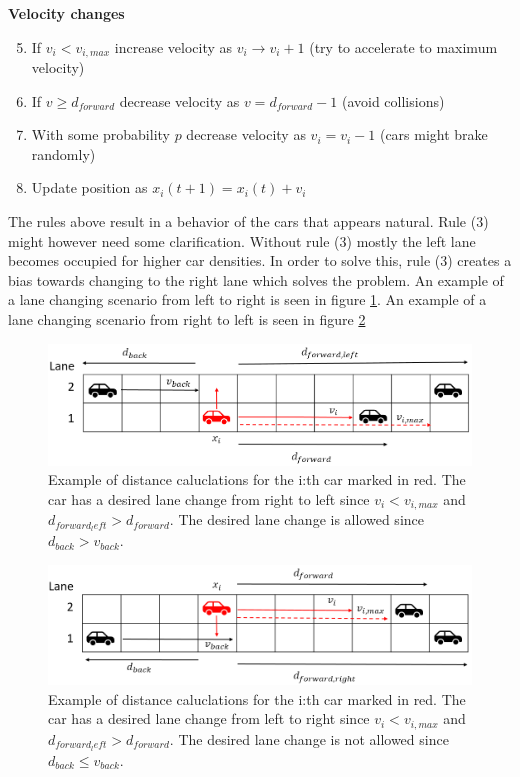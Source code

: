\documentclass[a4paper,12pt]{article}
\begin{document}
\textbf{Velocity changes}
\begin{enumerate}
    \setcounter{enumi}{4}
    \item If $v_i<v_{i, max}$ increase velocity as $v_i \rightarrow v_i+1$ (try to accelerate to maximum velocity)
    \item If $v \geq d_{forward}$ decrease velocity as $v = d_{forward} - 1$ (avoid collisions)
    \item With some probability $p$ decrease velocity as $v_i=v_i-1$ (cars might brake randomly)
    \item Update position as $x_i(t+1) = x_i(t) + v_i$
\end{enumerate}

The rules above result in a behavior of the cars that appears natural. Rule (3) might however need some
clarification. Without rule (3) mostly the left lane becomes occupied for higher car densities. In order to solve this, rule (3) creates
a bias towards changing to the right lane which solves the problem. An example of a lane changing scenario from left to right is seen in figure
\ref*{left turn}. An example of a lane changing scenario from right to left is seen in figure \ref*{right turn}

\begin{figure}[H]
    \centering
    \includegraphics[scale=0.6]{Images/left turn.png}
    \caption{Example of distance caluclations for the i:th car marked in red. The car has a desired
    lane change from right to left since $v_i < v_{i, max}$ and $d_{forward_left}>d_{forward}$. The desired lane change
    is allowed since $d_{back} > v_{back}$.}
    \label{left turn}
\end{figure}

\begin{figure}[H]
    \centering
    \includegraphics[scale=0.6]{Images/right turn.png}
    \caption{Example of distance caluclations for the i:th car marked in red. The car has a desired
    lane change from left to right since $v_i < v_{i, max}$ and $d_{forward_left}>d_{forward}$. The desired lane change
    is not allowed since $d_{back} \leq v_{back}$.}
    \label{right turn}
\end{figure}
\end{document}
